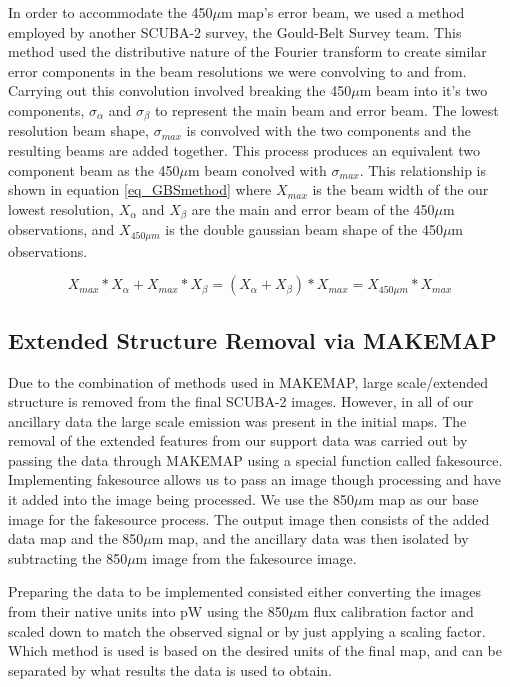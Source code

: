 In order to accommodate the 450$\mu$m map's error beam, we used a method employed by another SCUBA-2 survey, the Gould-Belt Survey team.  This method used the distributive nature of the Fourier transform to create similar error components in the beam resolutions we were convolving to and from.  Carrying out this convolution involved breaking the 450$\mu$m beam into it's two components, $\sigma_{\alpha}$ and $\sigma_{\beta}$ to represent the main beam and error beam.  The lowest resolution beam shape, $\sigma_{max}$ is convolved with the two components and the resulting beams are added together.  This process produces an equivalent two component beam as the 450$\mu$m beam conolved with $\sigma_{max}$.  This relationship is shown in equation \ref{eq_GBSmethod} where $X_{max}$ is the beam width of the our lowest resolution, $X_{\alpha}$ and $X_{\beta}$ are the main and error beam of the 450$\mu$m observations, and $X_{450\mu m}$ is the double gaussian beam shape of the 450$\mu$m observations.

\begin{equation} \label{eq_GBSmethod}
  X_{max} \ast X_{\alpha} + X_{max} \ast X_{\beta} = \left(X_{\alpha} + X_{\beta}\right) \ast X_{max} = X_{450\mu m} \ast X_{max}
\end{equation}

\subsection{Extended Structure Removal via MAKEMAP}\label{fakesource_sec}


Due to the combination of methods used in MAKEMAP, large scale/extended structure is removed from the final SCUBA-2 images.  However, in all of our ancillary data the large scale emission was present in the initial maps.  The removal of the extended features from our support data was carried out by passing the data through MAKEMAP using a special function called fakesource.  Implementing fakesource allows us to pass an image though processing and have it added into the image being processed.  We use the 850$\mu$m map as our base image for the fakesource process.  The output image then consists of the added data map and the 850$\mu$m map, and the ancillary data was then isolated by subtracting the 850$\mu$m image from the fakesource image.  

Preparing the data to be implemented consisted either converting the images from their native units into pW using the 850$\mu$m flux calibration factor and scaled down to match the observed signal or by just applying a scaling factor.  Which method is used is based on the desired units of the final map, and can be separated by what results the data is used to obtain.

